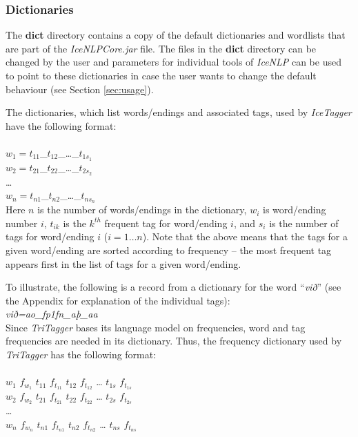 \documentclass[11pt]{article}
\begin{document}
\subsubsection{Dictionaries}
\label{sec:dict}
The {\bf dict} directory contains a copy of the default dictionaries and wordlists that are part of the \emph{IceNLPCore.jar} file. The files in the {\bf dict} directory can be changed by the user and parameters for individual tools of \emph{IceNLP} can be used to point to these dictionaries in case the user wants to change the default behaviour (see Section \ref{sec:usage}).

The dictionaries, which list words/endings and associated tags, used by \emph{IceTagger} have the following format: \\\\
$w_{1}=t_{11}$\_$t_{12}$\_\ldots\_$t_{1s_{1}}$ \\
$w_{2}=t_{21}$\_$t_{22}$\_\ldots\_$t_{2s_{2}}$ \\
\ldots \\
$w_{n}=t_{n1}$\_$t_{n2}$\_\ldots\_$t_{ns_{n}}$ \\

Here $n$ is the number of words/endings in the dictionary, $w_{i}$ is word/ending number $i$, $t_{ik}$ is the $k^{th}$ frequent tag for word/ending $i$, and $s_{i}$ is the number of tags for word/ending $i$ ($i=1{\ldots}n$).
Note that the above means that the tags for a given word/ending are sorted according to frequency -- the most frequent tag appears first in the list of tags for a given word/ending.

To illustrate, the following is a record from a dictionary for the word ``\emph{við}'' (see the Appendix for explanation of the individual tags): \\
\emph{við=ao\_fp1fn\_aþ\_aa} \\

Since \emph{TriTagger} bases its language model on frequencies, word and tag frequencies are needed in its dictionary. Thus, the frequency dictionary used by \emph{TriTagger} has the following format: \\\\
$w_{1}$ $f_{w_{1}}$ $t_{11}$ $f_{t_{11}}$ $t_{12}$ $f_{t_{12}}$ {\ldots} $t_{1s}$ $f_{t_{1s}}$ \\
$w_{2}$ $f_{w_{2}}$ $t_{21}$ $f_{t_{21}}$ $t_{22}$ $f_{t_{22}}$ {\ldots} $t_{2s}$ $f_{t_{2s}}$ \\
\ldots \\
$w_{n}$ $f_{w_{n}}$ $t_{n1}$ $f_{t_{n1}}$ $t_{n2}$ $f_{t_{n2}}$ {\ldots} $t_{ns}$ $f_{t_{ns}}$ \\
\end{document}
